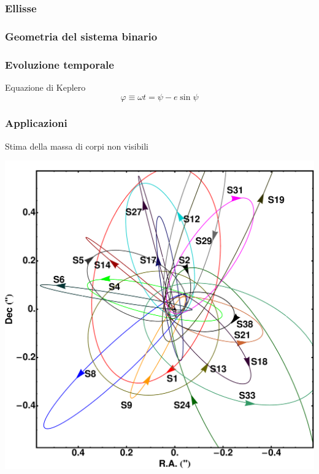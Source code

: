 \documentclass[10pt]{beamer}
\renewcommand{\phi}{\varphi}
\begin{document}
\begin{frame}
  \frametitle{Ellisse}
  \begin{tikzpicture}[scale=4.5,font=\tiny]
    
  \end{tikzpicture}
\end{frame}

\begin{frame}
  \frametitle{Geometria del sistema binario}
  \begin{center}
    \begin{tikzpicture}[tdplot_main_coords,scale=4.5,font=\tiny]
      
    \end{tikzpicture}
  \end{center}
\end{frame}

\begin{frame}
  \frametitle{Evoluzione temporale}
  \begin{block}{Equazione di Keplero}
    \begin{equation*}
    \phi \equiv \omega t = \psi - e\sin\psi
  \end{equation*}
  \end{block}
  \begin{center}
    \begin{tikzpicture}[font=\tiny,scale=1.9]
      
    \end{tikzpicture}
  \end{center}
\end{frame}

\begin{frame}
  \frametitle{Applicazioni}
  \begin{adv}
  \item Stima della massa di corpi non visibili
  \end{adv}
  \begin{center}
    \includegraphics[width=0.5\columnwidth]{Immagini/orbite_sgra}
  \end{center}
\end{frame}
\end{document}
